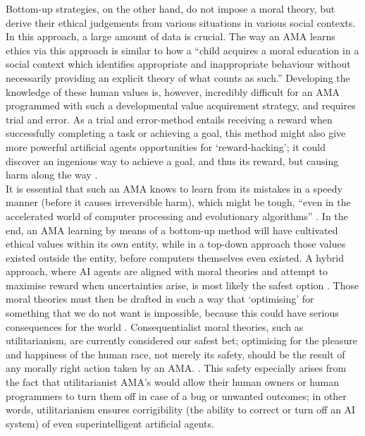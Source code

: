\documentclass[final]{clv3} %
\begin{document}
Bottom-up strategies, on the other hand, do not impose a moral theory, but derive their ethical judgements from various situations in various social contexts. In this approach, a large amount of data is crucial. The way an AMA learns ethics via this approach is similar to how a “child acquires a moral education in a social context which identifies appropriate and inappropriate behaviour without necessarily providing an explicit theory of what counts as such.” \cite[p. 151]{allen2005} Developing the knowledge of these human values is, however, incredibly difficult for an AMA programmed with such a developmental value acquirement strategy, and requires trial and error. As a trial and error-method entails receiving a reward when successfully completing a task or achieving a goal, this method might also give more powerful artificial agents opportunities for ‘reward-hacking’; it could discover an ingenious way to achieve a goal, and thus its reward, but causing harm along the way \cite{gabriel}. \\

It is essential that such an AMA knows to learn from its mistakes in a speedy manner (before it causes irreversible harm), which might be tough, “even in the accelerated world of computer processing and evolutionary algorithms” \cite[p. 151]{allen2005}. In the end, an AMA learning by means of a bottom-up method will have cultivated ethical values within its own entity, while in a top-down approach those values existed outside the entity, before computers themselves even existed. A hybrid approach, where AI agents are aligned with moral theories and attempt to maximise reward when uncertainties arise, is most likely the safest option \cite{gabriel}. Those moral theories must then be drafted in such a way that ‘optimising’ for something that we do not want is impossible, because this could have serious consequences for the world \cite{bostrom}. Consequentialist moral theories, such as utilitarianism, are currently considered our safest bet; optimising for the pleasure and happiness of the human race, not merely its safety, should be the result of any morally right action taken by an AMA. \cite{gabriel}. This safety especially arises from the fact that utilitarianist AMA’s would allow their human owners or human programmers to turn them off in case of a bug or unwanted outcomes; in other words, utilitarianism ensures corrigibility (the ability to correct or turn off an AI system) \cite{soares} of even superintelligent artificial agents.\\
\end{document}
